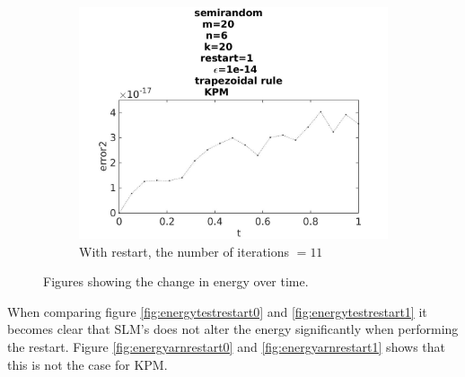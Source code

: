 \begin{figure}[H]
\begin{subfigure}[b]{0.3\textwidth}
                \includegraphics[width=\textwidth]{../MATLAB/fig/errorarnrestart12.jpg}
                \caption{ With restart, the number of iterations $ = 11$ }
                \label{fig:energyarnrestart12}
        \end{subfigure}
        \caption{ Figures showing the change in energy over time. }
        \label{fig:energyarnrestart2}
\end{figure}

When comparing figure \ref{fig:energytestrestart0} and \ref{fig:energytestrestart1} it becomes clear that SLM's does not alter the energy significantly when performing the restart. Figure \ref{fig:energyarnrestart0} and \ref{fig:energyarnrestart1} shows that this is not the case for KPM.\\
